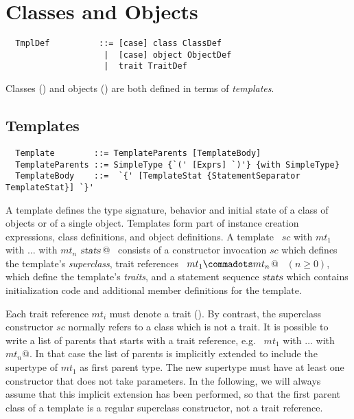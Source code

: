 \chapter{Classes and Objects}
\label{sec:globaldefs}

\syntax\begin{lstlisting}
  TmplDef          ::= [case] class ClassDef
                    |  [case] object ObjectDef
                    |  trait TraitDef
\end{lstlisting}

Classes () and objects
() are both defined in terms of {\em templates}.

\section{Templates}
\label{sec:templates}

\syntax\begin{lstlisting}
  Template        ::= TemplateParents [TemplateBody]
  TemplateParents ::= SimpleType {`(' [Exprs] `)'} {with SimpleType}
  TemplateBody    ::=  `{' [TemplateStat {StatementSeparator TemplateStat}] `}'
\end{lstlisting}

A template defines the type signature, behavior and initial state of a
class of objects or of a single object. Templates form part of
instance creation expressions, class definitions, and object
definitions.  A template 
~\lstinline@$sc$ with $mt_1$ with $\ldots$ with $mt_n$ {$\mbox{\sl stats}\,$}@~ 
consists of a constructor invocation $sc$
which defines the template's {\em superclass}, trait references
~\lstinline@$mt_1 \commadots mt_n$@~ $(n \geq 0)$, which define the
template's {\em traits}, and a statement sequence $\mbox{\sl stats}$ which
contains initialization code and additional member definitions for the
template.

Each trait reference $mt_i$ must denote a trait ().
By contrast, the superclass constructor $sc$ normally refers to a
class which is not a trait. It is possible to write a list of
parents that starts with a trait reference, e.g.
~\lstinline@$mt_1$ with $\ldots$ with $mt_n$@. In that case the list
of parents is implicitly extended to include the supertype of $mt_1$
as first parent type. The new supertype must have at least one
constructor that does not take parameters.  In the following, we will
always assume that this implicit extension has been performed, so that
the first parent class of a template is a regular superclass
constructor, not a trait reference.

